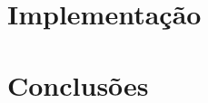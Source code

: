 \documentclass[brazil]{article}
\begin{document}

\section{Implementação}


\section{Conclusões}
\end{document}
